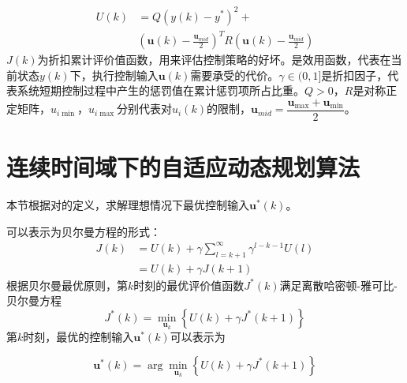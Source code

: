 \begin{equation}\label{equ:U}
\begin{aligned}
U ( k ) &= Q \left( y ( k ) - y ^ { * } \right) ^ { 2 } + \\ &
\left( \pmb u ( k ) - \frac { \pmb u _ { mid } } { 2 } \right) ^ { T
} R \left( \pmb u ( k ) - \frac { \pmb u_{mid} } { 2 } \right)
\end{aligned}
\end{equation}
    $J(k)$为折扣累计评价值函数，用来评估控制策略的好坏。是效用函数，代表在当前状态$y(k)$下，执行控制输入${\pmb u}(k)$需要承受的代价。$\gamma \in (0,1]$是折扣因子，代表系统短期控制过程中产生的惩罚值在累计惩罚项所占比重。$Q>0$，$R$是对称正定矩阵，$u _{i\min}$，$u _{i\max}$分别代表对$u _ { i } ( k ) $的限制，$\pmb u_{mid}=\dfrac{\pmb u _ { \max } + \pmb u _ { \min }}{2}$。
    


\section{连续时间域下的自适应动态规划算法}
\label{sec:ideal_PI}
本节根据对的定义，求解理想情况下最优控制输入$\pmb
u^*(k)$。

可以表示为贝尔曼方程的形式：
\begin{equation}
\label{equ:J_bellman}
\begin{aligned} J \left(  k  \right) & = U(k) + \gamma \sum _ { l = k + 1 } ^ { \infty } \gamma ^ { l- k - 1 } U \left( l \right) \\ & = U(k) + \gamma J \left( k+1\right) \end{aligned}
\end{equation}
根据贝尔曼最优原则，第$k$时刻的最优评价值函数$J^*(k)$满足离散哈密顿-雅可比-贝尔曼方程
\begin{equation}
\label{equ:J_star} J ^ { * } \left( k \right) = \min _ { \pmb u _ {
k } } \left\{ U(k) + \gamma J ^ { * } \left( k+1 \right) \right\}
\end{equation}
第$k$时刻，最优的控制输入$\pmb u^*(k)$可以表示为

\begin{equation}
\label{equ:u_star_k} \pmb u ^ { * } \left( k \right) = \arg \min _ {
\pmb u _ { k } } \left\{ U(k) + \gamma J ^ { * } \left(k+1 \right)
\right\}
\end{equation}


